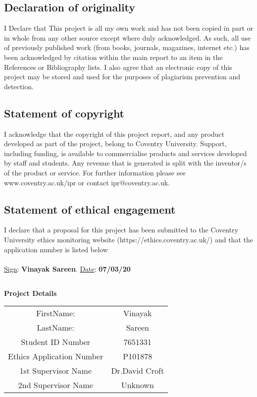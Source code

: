 \subsection*{Declaration of originality}
I Declare that This project is all my own work and has not been copied in part or in whole from any other source except where duly acknowledged.  As such, all use of previously published work (from books, journals, magazines, internet etc.) has been acknowledged by citation within the main report to an item in the References or Bibliography lists. I also agree that an electronic copy of this project may be stored and used for the purposes of plagiarism prevention and detection.
\subsection*{Statement of copyright}
I acknowledge that the copyright of this project report, and any product developed as part of the project, belong to Coventry University. 
Support, including funding, is available to commercialise products and services developed by staff and students. 
 Any revenue that is generated is split with the inventor/s of the product or service. 
For further information please see www.coventry.ac.uk/ipr or contact ipr@coventry.ac.uk.
\subsection*{Statement of ethical engagement}

I declare that a proposal for this project has been submitted to the Coventry University ethics monitoring website (https://ethics.coventry.ac.uk/) and that the application number is listed below \\
\\ 
\underline{Sign}: \textbf{Vinayak Sareen}. \hspace{20mm} \underline{Date}:  \textbf{07/03/20}
\pagebreak
\subsection*{}
\begin{center}
    \textbf{Project Details }\\
    \vspace{2mm}
\begin{tabular} {| c | c |}
	\hline
    FirstName: &Vinayak \\
    LastName: & Sareen \\
    Student ID Number & 7651331 \\
    Ethics Application Number & P101878 \\
    1st Supervisor Name & Dr.David Croft \\
    2nd Supervisor Name & Unknown \\
    \hline
\end{tabular}
\end{center}
